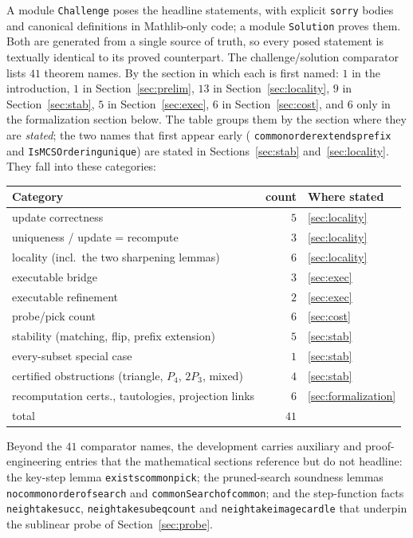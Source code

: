 \documentclass[11pt]{article}
\theoremstyle{definition}
\theoremstyle{remark}
\newcommand{\leanname}[1]{%
  \texttt{\begingroup\def\_{\textunderscore\allowbreak}#1\endgroup}}
\begin{document}
A module \leanname{Challenge} poses the headline statements, with explicit
\texttt{sorry} bodies and canonical definitions in Mathlib-only code; a module
\leanname{Solution} proves them. Both are generated from a single source of
truth, so every posed statement is textually identical to its proved
counterpart.
The challenge/solution comparator lists $41$ theorem names. By the section in
which each is first named: $1$ in the introduction, $1$ in
Section~\ref{sec:prelim}, $13$ in Section~\ref{sec:locality}, $9$ in
Section~\ref{sec:stab}, $5$ in Section~\ref{sec:exec}, $6$ in
Section~\ref{sec:cost}, and $6$ only in the formalization section below. The
table groups them by the section where they are \emph{stated}; the two names
that first appear early (\leanname{common\_order\_extends\_prefix} and
\leanname{IsMCSOrdering\_unique}) are stated in Sections~\ref{sec:stab}
and~\ref{sec:locality}. They fall into these categories:

\begin{center}
\begin{tabular}{lrl}
\toprule
Category & count & Where stated \\
\midrule
update correctness & $5$ & \ref{sec:locality} \\
uniqueness / update = recompute & $3$ & \ref{sec:locality} \\
locality (incl.\ the two sharpening lemmas) & $6$ & \ref{sec:locality} \\
executable bridge & $3$ & \ref{sec:exec} \\
executable refinement & $2$ & \ref{sec:exec} \\
probe/pick count & $6$ & \ref{sec:cost} \\
stability (matching, flip, prefix extension) & $5$ & \ref{sec:stab} \\
every-subset special case & $1$ & \ref{sec:stab} \\
certified obstructions (triangle, $P_4$, $2P_3$, mixed) & $4$ & \ref{sec:stab} \\
recomputation certs., tautologies, projection links & $6$ & \ref{sec:formalization} \\
\midrule
total & $41$ & \\
\bottomrule
\end{tabular}
\end{center}

Beyond the $41$ comparator names, the development carries auxiliary and
proof-engineering entries that the mathematical sections reference but do not
headline: the key-step lemma \leanname{exists\_common\_pick}; the pruned-search
soundness lemmas \leanname{no\_common\_order\_of\_search} and
\leanname{commonSearch\_of\_common}; and the step-function facts
\leanname{neigh\_take\_succ}, \leanname{neigh\_take\_sub\_eq\_count} and
\leanname{neigh\_take\_image\_card\_le} that underpin the sublinear probe of
Section~\ref{sec:probe}.
\end{document}
